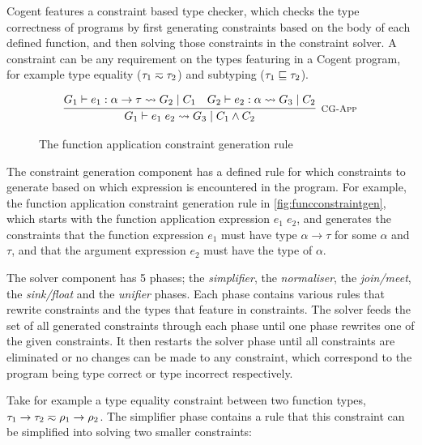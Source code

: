 Cogent features a constraint based type checker, which checks the type
correctness of programs by first generating constraints based on the
body of each defined function, and then solving those constraints in
the constraint solver. A constraint can be any requirement on the types
featuring in a Cogent program, for example type equality ($\tau_1 \typeeq \tau_2$)
and subtyping ($\tau_1 \sqsubseteq \tau_2$).

\begin{figure}
    \centering
    \[
        \infer[\textsc{\footnotesize CG-App}]{
            G_1 \vdash e_1\; e_2 \rightsquigarrow G_3\; |\; C_1 \land C_2
        }{
            G_1 \vdash e_1 : \alpha \rightarrow \tau
                \rightsquigarrow G_2\; |\; C_1
            \hspace{1em}
            G_2 \vdash e_2 : \alpha \rightsquigarrow G_3\; |\; C_2
        }    
    \]
    
    \caption{The function application constraint generation rule}
    \label{fig:funcconstraintgen}
\end{figure}

The constraint generation component has a defined rule for which constraints
to generate based on which expression is encountered in the program. For
example, the function application constraint generation rule in
\autoref{fig:funcconstraintgen}, which starts with the function application
expression $e_1\; e_2$, and generates the constraints that the function
expression $e_1$ must have type $\alpha \rightarrow \tau$ for some
$\alpha$ and $\tau$, and that the argument expression $e_2$ must have
the type of $\alpha$.

The solver component has 5 phases; the \textit{simplifier}, the \textit{normaliser},
the \textit{join/meet}, the \textit{sink/float} and the \textit{unifier} 
phases. Each phase contains various rules that rewrite constraints
and the types that feature in constraints. The solver feeds the set of
all generated constraints through each phase until one phase rewrites
one of the given constraints. It then restarts the solver phase until
all constraints are eliminated or no changes can be made to any constraint,
which correspond to the program being type correct or type incorrect respectively.

Take for example a type equality constraint between two function types,
$\tau_1 \rightarrow \tau_2 \typeeq \rho_1 \rightarrow \rho_2$. The simplifier
phase contains a rule that this constraint can be simplified into solving
two smaller constraints: 

